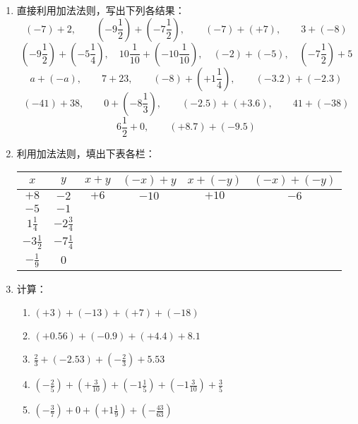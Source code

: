 \begin{enumerate}
	\item 直接利用加法法则，写出下列各结果：
	\[(-7)+2,\qquad \left(-9\frac{1}{2}\right)+\left(-7\frac{1}{2}\right),\qquad (-7)+(+7),\qquad 3+(-8)\]    
	\[\left(-9\frac{1}{2}\right)+\left(-5\frac{1}{4}\right),\quad 10\frac{1}{10}+\left(-10\frac{1}{10}\right),\quad (-2)+(-5),\quad \left(-7\frac{1}{2}\right)+5 \]
	\[a+(-a),\qquad 7+23,\qquad (-8)+\left(+1\frac{1}{4}\right),\qquad (-3.2)+(-2.3) \]
	\[(-41)+38,\qquad 0+\left(-8\frac{1}{3}\right),\qquad (-2.5)+(+3.6),\qquad 41+(-38)\]
	\[6\frac{1}{2}+0,\qquad (+8.7)+(-9.5) \]
	\item 利用加法法则，填出下表各栏：
	\begin{center}
		\begin{tabular}{c|c|c|c|c|c}
			\hline
			$x$& $y$&  $x+y$& $(-x)+y$& $x+(-y)$& $(-x)+(-y)$\\ 
			\hline
			$+8$ &$-2$&$+6$&$-10$&$+10$&$-6$\\
			$-5$ & $-1$ \\
			$1\frac{1}{4}$ & $-2\frac{3}{4}$ \\
			$-3\frac{1}{2}$ & $-7\frac{1}{4}$ \\
			$-\frac{1}{9}$ & $0$ \\
			\hline
		\end{tabular}
	\end{center}
	
	\item 计算：
	\begin{enumerate}
		\item $(+3)+(-13)+(+7)+(-18)$
		\item $(+0.56)+(-0.9)+(+ 4.4)+8.1$
		\item $\frac{2}{3}+(-2.53)+\left(-\frac{2}{3}\right)+5.53$
		\item $\left(-\frac{2}{5}\right)+\left(+\frac{3}{10}\right)+\left(-1 \frac{1}{5}\right)+\left(-1 \frac{3}{10}\right)+\frac{3}{5}$
		\item $\left(-\frac{3}{7}\right)+0+\left(+1 \frac{1}{9}\right)+\left(-\frac{43}{63} \right)$
	\end{enumerate}
	

\end{enumerate}
